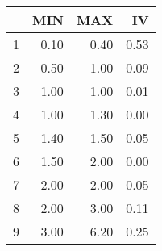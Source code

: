 \begin{table}[ht]
\centering
\begin{tabular}{rrrr}
  \hline
 & MIN & MAX & IV \\ 
  \hline
1 & 0.10 & 0.40 & 0.53 \\ 
  2 & 0.50 & 1.00 & 0.09 \\ 
  3 & 1.00 & 1.00 & 0.01 \\ 
  4 & 1.00 & 1.30 & 0.00 \\ 
  5 & 1.40 & 1.50 & 0.05 \\ 
  6 & 1.50 & 2.00 & 0.00 \\ 
  7 & 2.00 & 2.00 & 0.05 \\ 
  8 & 2.00 & 3.00 & 0.11 \\ 
  9 & 3.00 & 6.20 & 0.25 \\ 
   \hline
\end{tabular}
\end{table}

